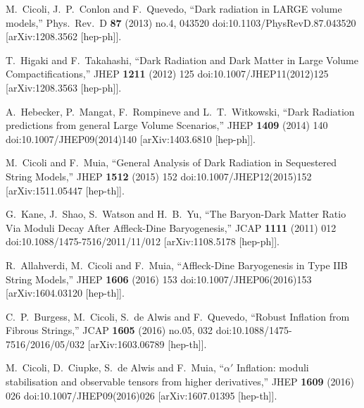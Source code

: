 \documentclass[11pt,a4paper]{article}
\begin{document}
\begin{thebibliography}{99}
  M.~Cicoli, J.~P.~Conlon and F.~Quevedo,
  ``Dark radiation in LARGE volume models,''
  Phys.\ Rev.\ D {\bf 87} (2013) no.4,  043520
  doi:10.1103/PhysRevD.87.043520
  [arXiv:1208.3562 [hep-ph]].
  
  T.~Higaki and F.~Takahashi,
  ``Dark Radiation and Dark Matter in Large Volume Compactifications,''
  JHEP {\bf 1211} (2012) 125
  doi:10.1007/JHEP11(2012)125
  [arXiv:1208.3563 [hep-ph]].

  A.~Hebecker, P.~Mangat, F.~Rompineve and L.~T.~Witkowski,
  ``Dark Radiation predictions from general Large Volume Scenarios,''
  JHEP {\bf 1409} (2014) 140
  doi:10.1007/JHEP09(2014)140
  [arXiv:1403.6810 [hep-ph]].
	
  M.~Cicoli and F.~Muia,
  ``General Analysis of Dark Radiation in Sequestered String Models,''
  JHEP {\bf 1512} (2015) 152
  doi:10.1007/JHEP12(2015)152
  [arXiv:1511.05447 [hep-th]].

  G.~Kane, J.~Shao, S.~Watson and H.~B.~Yu,
  ``The Baryon-Dark Matter Ratio Via Moduli Decay After Affleck-Dine Baryogenesis,''
  JCAP {\bf 1111} (2011) 012
  doi:10.1088/1475-7516/2011/11/012
  [arXiv:1108.5178 [hep-ph]].
	
  R.~Allahverdi, M.~Cicoli and F.~Muia,
  ``Affleck-Dine Baryogenesis in Type IIB String Models,''
  JHEP {\bf 1606} (2016) 153
  doi:10.1007/JHEP06(2016)153
  [arXiv:1604.03120 [hep-th]].

  C.~P.~Burgess, M.~Cicoli, S.~de Alwis and F.~Quevedo,
  ``Robust Inflation from Fibrous Strings,''
  JCAP {\bf 1605} (2016) no.05,  032
  doi:10.1088/1475-7516/2016/05/032
  [arXiv:1603.06789 [hep-th]].

  M.~Cicoli, D.~Ciupke, S.~de Alwis and F.~Muia,
  ``$\alpha'$ Inflation: moduli stabilisation and observable tensors from higher derivatives,''
  JHEP {\bf 1609} (2016) 026
  doi:10.1007/JHEP09(2016)026
  [arXiv:1607.01395 [hep-th]].


\end{thebibliography}
\end{document}
